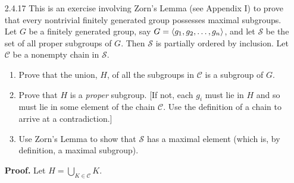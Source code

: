 \begin{enumerate}
\begin{enumerate}
               some subgroup $K$ of $G$. It follows by Theorem 7 (3) that
               $K = \cyc{x^s}$, where $s \mid n$. Since
               $\cyc{x^p} \le \cyc{x^s}$, we particularly have that
               $x^p \in \cyc{x^s}$, so that $x^p = x^{st}$ (for some suitable
               integer $t$); i.e., $x^{p-st} = 1$, and thus, $n \mid p - st$
               (Proposition 2). So write $p = st + nl$, for some integer $l$.
               Since $s \mid n$, it follows that $s \mid p$. But $p$ is prime,
               so $s = 1$ or $s = p$. Hence $\cyc{x^s} = G$ or
               $\cyc{x^s} = \cyc{x^p}$. Thus $\cyc{x^p}$ is a maximal subgroup
               of $G$. \qed
     \end{enumerate}
   \item[2.4.17]  This is an exercise involving Zorn's Lemma (see Appendix I) to
                  prove that every nontrivial finitely generated group possesses
                  maximal subgroups. Let $G$ be a finitely generated group, say
                  $G = \langle g_1, g_2, \ldots, g_n \rangle$, and let $\mathcal{S}$ be
                  the set of all proper subgroups of $G$. Then $\mathcal{S}$ is
                  partially ordered by inclusion. Let $\mathcal{C}$ be a
                  nonempty chain in $\mathcal{S}$.
                  \begin{enumerate}
                     \item Prove that the union, $H$, of all the subgroups in
                           $\mathcal{C}$ is a subgroup of $G$.
                     \item Prove that $H$ is a \textit{proper} subgroup. [If
                           not, each $g_i$ must lie in $H$ and so must lie in
                           some element of the chain $\mathcal{C}$. Use the
                           definition of a chain to arrive at a contradiction.]
                     \item Use Zorn's Lemma to show that $\mathcal{S}$ has a
                           maximal element (which is, by definition, a maximal
                           subgroup).
                  \end{enumerate}

      \textbf{Proof.} Let $H = \bigcup_{K\in\mathcal{C}}K$.


\end{enumerate}
